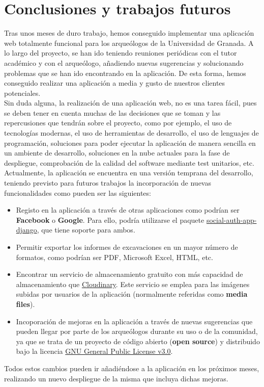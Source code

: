 \chapter{Conclusiones y trabajos futuros}
Tras unos meses de duro trabajo, hemos conseguido implementar una aplicación web totalmente
funcional para los arqueólogos de la Universidad de Granada. A lo largo del proyecto, se han
ido teniendo reuniones periódicas con el tutor académico y con el arqueólogo, añadiendo
nuevas sugerencias y solucionando problemas que se han ido encontrando en la aplicación. De
esta forma, hemos conseguido realizar una aplicación a media y gusto de nuestros clientes
potenciales. \\

Sin duda alguna, la realización de una aplicación web, no es una tarea fácil, pues se deben
tener en cuenta muchas de las decisiones que se toman y las repercusiones que tendrán sobre
el proyecto, como por ejemplo, el uso de tecnologías modernas, el uso de herramientas de
desarrollo, el uso de lenguajes de programación, soluciones para poder ejecutar la aplicación
de manera sencilla en un ambiente de desarrollo, soluciones en la nube actuales para la
fase de despliegue, comprobación de la calidad del software mediante test unitarios, etc. \\

Actualmente, la aplicación se encuentra en una versión temprana del desarrollo, teniendo
previsto para futuros trabajos la incorporación de nuevas funcionalidades como pueden ser
las siguientes:

    \begin{itemize}
        \item Registo en la aplicación a través de otras aplicaciones como podrían ser
        \textbf{Facebook} o \textbf{Google}. Para ello, podría utilizarse el paquete
        \href{https://python-social-auth.readthedocs.io/en/latest/configuration/django.html}
        {social-auth-app-django}, que tiene soporte para ambos.

        \item Permitir exportar los informes de excavaciones en un mayor número de formatos,
        como podrían ser PDF, Microsoft Excel, HTML, etc.

        \item Encontrar un servicio de almacenamiento gratuito con más capacidad de
        almacenamiento que \href{https://cloudinary.com/}{Cloudinary}. Este servicio se
        emplea para las imágenes subidas por usuarios de la aplicación (normalmente
        referidas como \textbf{media files}).

        \item Incoporación de mejoras en la aplicación a través de nuevas sugerencias que
        pueden llegar por parte de los arqueólogos durante su uso o de la comunidad, ya que
        se trata de un proyecto de código abierto (\textbf{open source}) y distribuido bajo
        la licencia \href{https://www.gnu.org/licenses/gpl-3.0.html}{GNU General Public
        License v3.0}.
    \end{itemize}

Todos estos cambios pueden ir añadiéndose a la aplicación en los próximos meses, realizando
un nuevo despliegue de la misma que incluya dichas mejoras.
